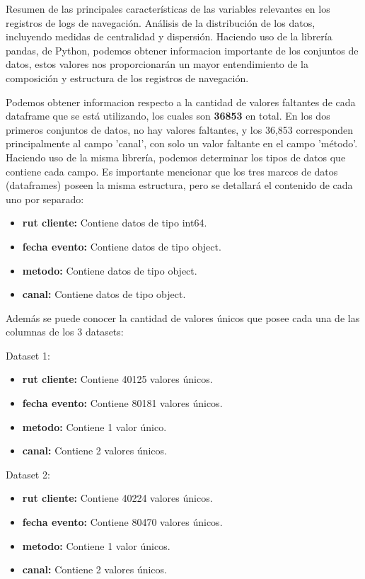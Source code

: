 Resumen de las principales características de las variables relevantes en los registros de logs de navegación.
Análisis de la distribución de los datos, incluyendo medidas de centralidad y dispersión. Haciendo uso de la librería pandas, de Python, podemos obtener informacion importante de los conjuntos de datos, estos valores nos proporcionarán un mayor entendimiento de la composición y estructura de los registros de navegación.

Podemos obtener informacion respecto a la cantidad de valores faltantes de cada dataframe que se está utilizando, los cuales son \textbf{36853} en total. En los dos primeros conjuntos de datos, no hay valores faltantes, y los 36,853 corresponden principalmente al campo 'canal', con solo un valor faltante en el campo 'método'. Haciendo uso de la misma librería, podemos determinar los tipos de datos que contiene cada campo. Es importante mencionar que los tres marcos de datos (dataframes) poseen la misma estructura, pero se detallará el contenido de cada uno por separado:
\begin{itemize}
    \item \textbf{rut cliente:} Contiene datos de tipo int64.
    \item \textbf{fecha evento:} Contiene datos de tipo object.
    \item \textbf{metodo:} Contiene datos de tipo object.
    \item \textbf{canal:} Contiene datos de tipo object.
\end{itemize}

Además se puede conocer la cantidad de valores únicos que posee cada una de las columnas de los 3 datasets:

Dataset 1:

\begin{itemize}
    \item \textbf{rut cliente:} Contiene 40125 valores únicos.
    \item \textbf{fecha evento:} Contiene 80181 valores únicos.
    \item \textbf{metodo:} Contiene 1 valor único.
    \item \textbf{canal:} Contiene 2 valores únicos.
\end{itemize}

Dataset 2:

\begin{itemize}
    \item \textbf{rut cliente:} Contiene 40224 valores únicos.
    \item \textbf{fecha evento:} Contiene 80470 valores únicos.
    \item \textbf{metodo:} Contiene 1 valor únicos.
    \item \textbf{canal:} Contiene 2 valores únicos.
\end{itemize}

